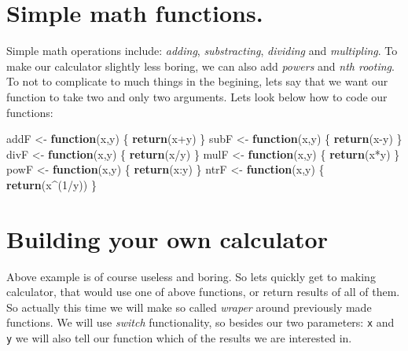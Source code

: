 \documentclass[]{book}
\newenvironment{Shaded}{\begin{snugshade}}{\end{snugshade}}
\newcommand{\KeywordTok}[1]{\textcolor[rgb]{0.12,0.11,0.11}{\textbf{#1}}}
\newcommand{\DecValTok}[1]{\textcolor[rgb]{0.69,0.50,0.00}{#1}}
\newcommand{\StringTok}[1]{\textcolor[rgb]{0.75,0.01,0.01}{#1}}
\newcommand{\ControlFlowTok}[1]{\textcolor[rgb]{0.12,0.11,0.11}{\textbf{#1}}}
\newcommand{\OperatorTok}[1]{\textcolor[rgb]{0.12,0.11,0.11}{#1}}
\newcommand{\NormalTok}[1]{\textcolor[rgb]{0.12,0.11,0.11}{#1}}
\theoremstyle{definition}
\theoremstyle{definition}
\theoremstyle{definition}
\theoremstyle{remark}
\begin{document}
\section{Simple math functions.}\label{simple-math-functions.}

Simple math operations include: \emph{adding}, \emph{substracting},
\emph{dividing} and \emph{multipling}. To make our calculator slightly
less boring, we can also add \emph{powers} and \emph{nth rooting}. To
not to complicate to much things in the begining, lets say that we want
our function to take two and only two arguments. Lets look below how to
code our functions:

\begin{Shaded}
\begin{Highlighting}[]
\NormalTok{addF <-}\StringTok{ }\ControlFlowTok{function}\NormalTok{(x,y) \{}
  \KeywordTok{return}\NormalTok{(x}\OperatorTok{+}\NormalTok{y)}
\NormalTok{\}}
\NormalTok{subF <-}\StringTok{ }\ControlFlowTok{function}\NormalTok{(x,y) \{}
  \KeywordTok{return}\NormalTok{(x}\OperatorTok{-}\NormalTok{y)}
\NormalTok{\}}
\NormalTok{divF <-}\StringTok{ }\ControlFlowTok{function}\NormalTok{(x,y) \{}
  \KeywordTok{return}\NormalTok{(x}\OperatorTok{/}\NormalTok{y)}
\NormalTok{\}}
\NormalTok{mulF <-}\StringTok{ }\ControlFlowTok{function}\NormalTok{(x,y) \{}
  \KeywordTok{return}\NormalTok{(x}\OperatorTok{*}\NormalTok{y)}
\NormalTok{\}}
\NormalTok{powF <-}\StringTok{ }\ControlFlowTok{function}\NormalTok{(x,y) \{}
  \KeywordTok{return}\NormalTok{(x}\OperatorTok{:}\NormalTok{y)}
\NormalTok{\}}
\NormalTok{ntrF <-}\StringTok{ }\ControlFlowTok{function}\NormalTok{(x,y) \{}
  \KeywordTok{return}\NormalTok{(x}\OperatorTok{^}\NormalTok{(}\DecValTok{1}\OperatorTok{/}\NormalTok{y))}
\NormalTok{\}}
\end{Highlighting}
\end{Shaded}

\section{Building your own
calculator}\label{building-your-own-calculator}

Above example is of course useless and boring. So lets quickly get to
making calculator, that would use one of above functions, or return
results of all of them. So actually this time we will make so called
\emph{wraper} around previously made functions. We will use
\emph{switch} functionality, so besides our two parameters: \texttt{x}
and \texttt{y} we will also tell our function which of the results we
are interested in.
\end{document}
